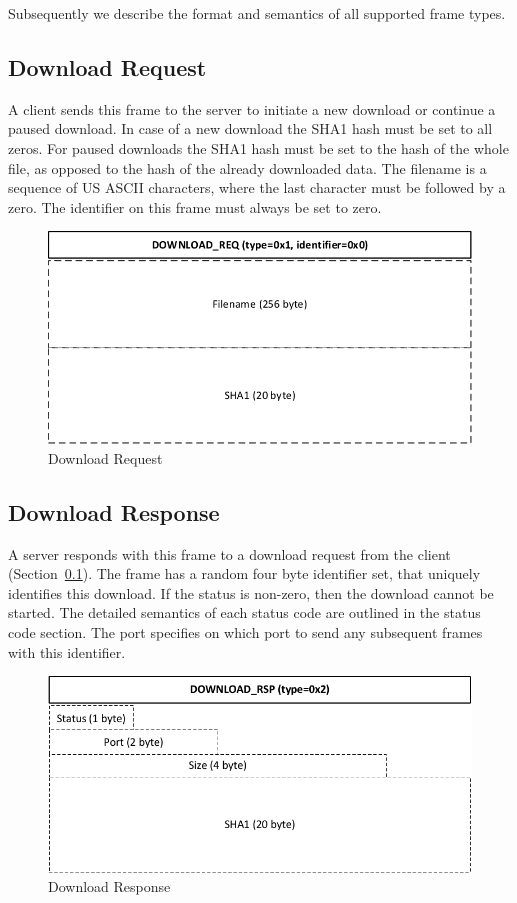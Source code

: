 \documentclass[]{article}
\begin{document}
Subsequently we describe the format and semantics of all supported frame types. 

\subsection{Download Request}
\label{DOWNLOAD-REQ}

A client sends this frame to the server to initiate a new download
or continue a paused download. In case of a new download the SHA1
hash must be set to all zeros. For paused downloads the SHA1 hash
must be set to the hash of the whole file, as opposed to the
hash of the already downloaded data. The filename is a sequence
of US ASCII characters, where the last character must be followed
by a zero. The identifier on this frame must always be set to zero. 

\begin{figure}[H]
\centering
\includegraphics[width=\textwidth]{frames/download-req.pdf}
\caption{Download Request}

\end{figure}

\subsection{Download Response}

A server responds with this frame to a download request from the
client (Section~\ref{DOWNLOAD-REQ}). The frame has a random four byte identifier set, that
uniquely identifies this download. If the status is non-zero, 
then the download cannot be started. The detailed semantics of each status code are outlined
in the status code section. The port specifies on which port to
send any subsequent frames with this identifier.

\begin{figure}[H]
\centering
\includegraphics[width=\textwidth]{frames/download-rsp.pdf}
\caption{Download Response}
\label{DOWNLOAD-RSP}
\end{figure}
\end{document}
